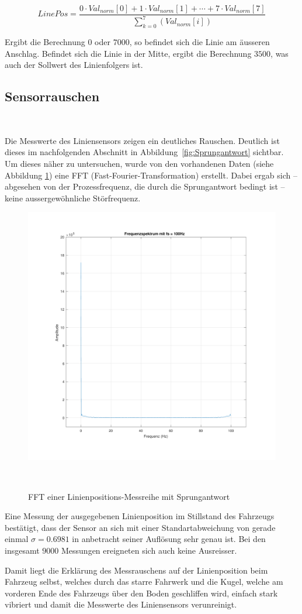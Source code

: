 \documentclass[main.tex]{subfiles} %
\begin{document}
\[
    LinePos = \frac{0 \cdot Val_{norm}[0] + 1 \cdot Val_{norm}[1] + \cdots + 7 \cdot Val_{norm}[7]}{\sum_{k=0}^{7}(Val_{norm}[i])}
\]

Ergibt die Berechnung $0$ oder $7000$, so befindet sich die Linie am äusseren
Anschlag. Befindet sich die Linie in der Mitte, ergibt die Berechnung $3500$,
was auch der Sollwert des Linienfolgers ist.

\subsection*{Sensorrauschen}~\label{apdx:Liniensensor_rauschen}

Die Messwerte des Liniensensors zeigen ein deutliches Rauschen. Deutlich ist
dieses im nachfolgenden Abschnitt in Abbildung~\ref{fig:Sprungantwort}
sichtbar. Um dieses näher zu untersuchen, wurde von den vorhandenen Daten
(siehe Abbildung \ref{fig:FFT_START}) eine FFT (Fast-Fourier-Transformation)
erstellt. Dabei ergab sich – abgesehen von der Prozessfrequenz, die durch die
Sprungantwort bedingt ist – keine aussergewöhnliche Störfrequenz.

\begin{figure}[H]
    \centering
    \includegraphics[width=0.5\linewidth]{fig_Parametrierung_Linienfolgeregler/FFT_START.pdf}
    \caption{FFT einer Linienpositions-Messreihe mit Sprungantwort}~\label{fig:FFT_START}
\end{figure}

Eine Messung der ausgegebenen Linienposition im Stillstand des Fahrzeugs
bestätigt, dass der Sensor an sich mit einer Standartabweichung von gerade
einmal $\sigma = 0.6981$ in anbetracht seiner Auflösung sehr genau ist. Bei den
insgesamt $9000$ Messungen ereigneten sich auch keine Ausreisser.

Damit liegt die Erklärung des Messrauschens auf der Linienposition beim
Fahrzeug selbst, welches durch das starre Fahrwerk und die Kugel, welche am
vorderen Ende des Fahrzeugs über den Boden geschliffen wird, einfach stark
vibriert und damit die Messwerte des Liniensensors verunreinigt.
\end{document}

